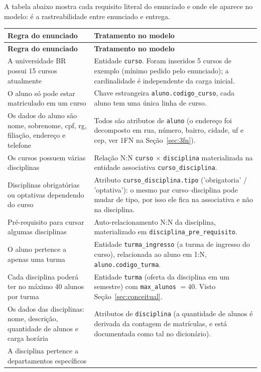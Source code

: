 \documentclass[12pt,a4paper]{article}
\begin{document}
A tabela abaixo mostra cada requisito literal do enunciado e onde ele
aparece no modelo: é a rastreabilidade entre enunciado e entrega.

\begin{longtable}{@{}p{}p{}@{}}
\toprule
\textbf{Regra do enunciado} & \textbf{Tratamento no modelo} \\
\midrule
\endfirsthead
\toprule
\textbf{Regra do enunciado} & \textbf{Tratamento no modelo} \\
\midrule
\endhead
A universidade BR possui 15 cursos atualmente
& Entidade \texttt{curso}. Foram inseridos 5 cursos de exemplo (mínimo
pedido pelo enunciado); a cardinalidade é independente da carga inicial. \\
O aluno só pode estar matriculado em um curso
& Chave estrangeira \texttt{aluno.codigo\_curso}, cada aluno tem uma
única linha de curso. \\
Os dados do aluno são nome, sobrenome, cpf, rg, filiação, endereço e
telefone
& Todos são atributos de \texttt{aluno} (o endereço foi decomposto em
rua, número, bairro, cidade, uf e cep, ver 1FN na Seção~\ref{sec:3fn}). \\
Os cursos possuem várias disciplinas
& Relação N:N \texttt{curso} $\times$ \texttt{disciplina} materializada
na entidade associativa \texttt{curso\_disciplina}. \\
Disciplinas obrigatórias ou optativas dependendo do curso
& Atributo \texttt{curso\_disciplina.tipo} ('obrigatoria' /
'optativa'): o mesmo par curso--disciplina pode mudar de tipo, por isso
ele fica na associativa e não na disciplina. \\
Pré-requisito para cursar algumas disciplinas
& Auto-relacionamento N:N da disciplina, materializado em
\texttt{disciplina\_pre\_requisito}. \\
O aluno pertence a apenas uma turma
& Entidade \texttt{turma\_ingresso} (a turma de ingresso do curso),
relacionada ao aluno em 1:N, \texttt{aluno.codigo\_turma}. \\
Cada disciplina poderá ter no máximo 40 alunos por turma
& Entidade \texttt{turma} (oferta da disciplina em um semestre) com
\texttt{max\_alunos} $= 40$. Visto Seção~\ref{sec:conceitual}. \\
Os dados das disciplinas: nome, descrição, quantidade de alunos e carga
horária
& Atributos de \texttt{disciplina} (a quantidade de alunos é derivada da
contagem de matrículas, e está documentada como tal no dicionário). \\
A disciplina pertence a departamentos específicos

\end{longtable}
\end{document}

